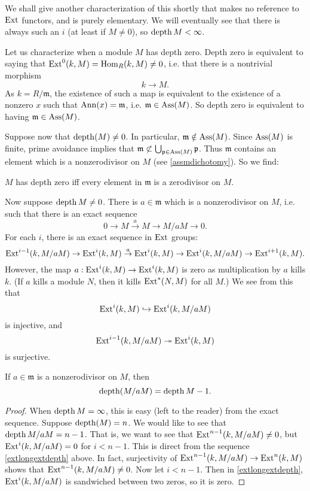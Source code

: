 We shall give another characterization of this shortly that makes no reference
to $\operatorname{Ext}$ functors, and is purely elementary.
We will eventually see that there is always such an $i$ (at least if $M \neq
0$), so $\operatorname{depth} M < \infty$.

\begin{example} Let us characterize when a module $M$ has depth zero. 
Depth zero is equivalent to saying that $\operatorname{Ext}^0(k,M) = \operatorname{Hom}_R(k, M) \neq 0$,
i.e. that there is a
nontrivial morphism
\[ k \to M.  \]
As $k = R/\mathfrak{m}$, the existence of such a map is
equivalent to the existence of a nonzero $x$
such that $\operatorname{Ann}(x) = \mathfrak{m}$, i.e. $\mathfrak{m} \in
\operatorname{Ass}(M)$. So depth
zero is equivalent to having $\mathfrak{m} \in \operatorname{Ass}(M)$.
\end{example}

Suppose now that $\operatorname{depth}(M) \neq 0$. In particular,
$\mathfrak{m} \notin
\operatorname{Ass}(M)$. Since $\operatorname{Ass}(M)$ is finite, prime avoidance implies that
$\mathfrak{m}
\not\subset \bigcup_{\mathfrak{p} \in \operatorname{Ass}(M)} \mathfrak{p}$.
Thus
$\mathfrak{m}$ contains an element which is a nonzerodivisor on
$M$ (see \cref{assmdichotomy}). So we find:

\begin{proposition} \label{depthzero}
$M$ has depth zero iff every element in $\mathfrak{m}$ is a
zerodivisor on $M$.
\end{proposition}

Now suppose $\operatorname{depth} M \neq 0$. There is $a \in \mathfrak{m}$
which is a
nonzerodivisor on $M$, i.e.  such that there is
an exact sequence
\[ 0 \to M \stackrel{a}{\to} M \to M/aM \to 0.  \]
For each $i$, there is an  exact sequence in $\operatorname{Ext}$ groups:
\begin{equation} \label{extlongextdepth}\operatorname{Ext}^{i-1}(k,M/aM) \to \operatorname{Ext}^i(k,M) \stackrel{a}{\to} \operatorname{Ext}^i(k,M)
\to \operatorname{Ext}^i(k,
M/aM) \to \operatorname{Ext}^{i+1}(k,M)  .\end{equation}
However, the map $a: \operatorname{Ext}^i(k,M) \to \operatorname{Ext}^i(k,M)$ is zero as
multiplication by $a$
kills $k$. (If $a$ kills a module $N$,
then it kills
$\operatorname{Ext}^*(N,M)$ for all $M$.) We see from this that
\[ \operatorname{Ext}^i(k,M) \hookrightarrow \operatorname{Ext}^i(k,M/aM)  \]
is injective, and
\[ \operatorname{Ext}^{i-1}(k, M/aM) \twoheadrightarrow \operatorname{Ext}^i(k,M)  \]
is surjective.

\begin{corollary} \label{depthdropsbyone}
If $a \in \mathfrak{m}$ is a nonzerodivisor on $M$, then
\[ \operatorname{depth}(M/aM) = \operatorname{depth} M -1.  \]
\end{corollary}
\begin{proof}
When $\operatorname{depth} M = \infty$, this is easy (left to the reader) from
the exact
sequence. Suppose $\operatorname{depth}(M) = n$. We would like to see that
$\operatorname{depth} M/aM =
n-1$. That is, we want to see that $\operatorname{Ext}^{n-1}(k,M/aM) \neq 0$,
but
$\operatorname{Ext}^i(k,M/aM) =
0$ for $i < n-1$. This is direct from the sequence \eqref{extlongextdepth} above.
In fact, surjectivity of $\operatorname{Ext}^{n-1}(k,M/aM) \to \operatorname{Ext}^n(k,M)$
shows that
$\operatorname{Ext}^{n-1}(k,M/aM) \neq 0$. Now let $i < n-1$. 
Then in \eqref{extlongextdepth}, $\operatorname{Ext}^i(k, M/aM)$ is sandwiched between two
zeros, so it is zero.
\end{proof}

